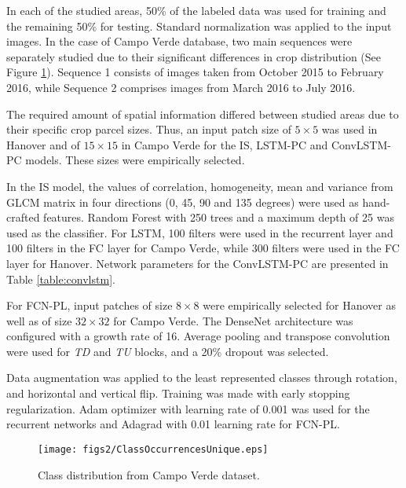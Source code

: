 In each of the studied areas, 50\% of the labeled data was used for training and the remaining 50\% for testing. Standard normalization was applied to the input images. In the case of Campo Verde database, two main sequences were separately studied due to their significant differences in crop distribution (See Figure \ref{fig:class_distr}). Sequence 1 consists of images taken from October 2015 to February 2016, while Sequence 2 comprises images from March 2016 to July 2016.

The required amount of spatial information differed between studied areas due to their specific crop parcel sizes. Thus, an input patch size of $5 \times 5$ was used in Hanover and of $15 \times 15$ in Campo Verde for the IS, LSTM-PC and ConvLSTM-PC models. These sizes were empirically selected. 

In the IS model, the values of correlation, homogeneity, mean and variance from GLCM matrix in four directions (0, 45, 90 and 135 degrees) were used as hand-crafted features. Random Forest with 250 trees and a maximum depth of 25 was used as the classifier. For LSTM, 100 filters were used in the recurrent layer and 100 filters in the FC layer for Campo Verde, while 300 filters were used in the FC layer for Hanover. Network parameters for the ConvLSTM-PC are presented in Table \ref{table:convlstm}. 

For FCN-PL, input patches of size $8 \times 8$ were empirically selected for Hanover as well as of size $32 \times 32$ for Campo Verde. The DenseNet architecture was configured with a growth rate of 16. Average pooling and transpose convolution were used for \textit{TD} and \textit{TU} blocks, and a 20\% dropout was selected. 

Data augmentation was applied to the least represented classes through rotation, and horizontal and vertical flip. Training was made with early stopping regularization. Adam optimizer with learning rate of 0.001 was used for the recurrent networks and Adagrad with 0.01 learning rate for FCN-PL.  
\begin{figure}[t!]
\centering
\texttt{[image: figs2/ClassOccurrencesUnique.eps]}
\caption{Class distribution from Campo Verde dataset. }
\label{fig:class_distr}
\end{figure}

